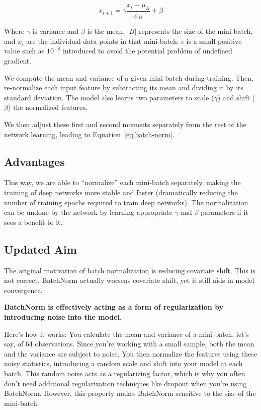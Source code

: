 \documentclass[11pt]{article}
\begin{document}
\begin{equation}
    x_{i+1} = \gamma \frac{x_i - \mu_B}{\sigma_B} + \beta\label{eq:batch-norm}
\end{equation}

\begin{center}
Where $\gamma$ is variance and $\beta$ is the mean. $|B|$ represents the size of the mini-batch, and $x_i$ are the individual data points in that mini-batch. $\epsilon$ is a small positive value such as $10^{-8}$ introduced to avoid the potential problem of undefined gradient.
\end{center}

We compute the mean and variance of a given mini-batch during training. Then, re-normalize each input feature by subtracting its mean and dividing it by its standard deviation. The model also learns two parameters to scale ($\gamma$) and shift ($\beta$) the normalized features. 

We then adjust these first and second moments separately from the rest of the network learning, leading to Equation~\ref{eq:batch-norm}. 

\subsection{Advantages}

This way, we are able to ``normalize'' each mini-batch separately, making the training of deep networks more stable and faster (dramatically reducing the number of training epochs required to train deep networks). The normalization can be undone by the network by learning appropriate $\gamma$ and $\beta$ parameters if it sees a benefit to it.

\subsection{Updated Aim}

The original motivation of batch normalization is reducing covariate shift. This is not correct. BatchNorm actually worsens covariate shift, yet it still aids in model convergence. 

\textbf{BatchNorm is effectively acting as a form of regularization by introducing noise into the model}. 

Here's how it works: You calculate the mean and variance of a mini-batch, let's say, of 64 observations. Since you're working with a small sample, both the mean and the variance are subject to noise. You then normalize the features using these noisy statistics, introducing a random scale and shift into your model at each batch. This random noise acts as a regularizing factor, which is why you often don't need additional regularization techniques like dropout when you're using BatchNorm. However, this property makes BatchNorm sensitive to the size of the mini-batch. 
\end{document}
